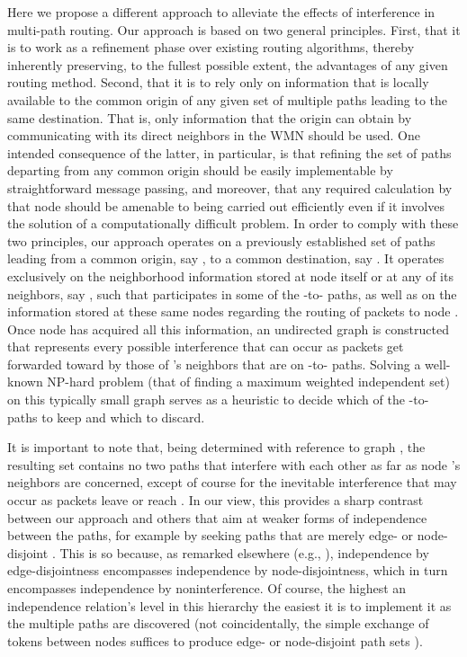 \documentclass{article}
\begin{document}
Here we propose a different approach to alleviate the effects of interference in
multi-path routing. Our approach is based on two general principles. First, that
it is to work as a refinement phase over existing routing algorithms, thereby
inherently preserving, to the fullest possible extent, the advantages of any
given routing method. Second, that it is to rely only on information that is
locally available to the common origin of any given set of multiple paths
leading to the same destination. That is, only information that the origin can
obtain by communicating with its direct neighbors in the WMN should be used. One
intended consequence of the latter, in particular, is that refining the set of
paths departing from any common origin should be easily implementable by
straightforward message passing, and moreover, that any required calculation by
that node should be amenable to being carried out efficiently even if it
involves the solution of a computationally difficult problem. In order to comply
with these two principles, our approach operates on a previously established set
of paths leading from a common origin, say , to a common destination, say
. It operates exclusively on the neighborhood information stored at node 
itself or at any of its neighbors, say , such that  participates in some
of the -to- paths, as well as on the information stored at these same
nodes regarding the routing of packets to node . Once node  has acquired
all this information, an undirected graph  is constructed that
represents every possible interference that can occur as packets get forwarded
toward  by those of 's neighbors that are on -to- paths. Solving a
well-known NP-hard problem (that of finding a maximum weighted independent set)
on this typically small graph serves as a heuristic to decide which of the
-to- paths to keep and which to discard.

It is important to note that, being determined with reference to graph ,
the resulting set contains no two paths that interfere with each other as far as
node 's neighbors are concerned, except of course for the inevitable
interference that may occur as packets leave  or reach . In our view, this
provides a sharp contrast between our approach and others that aim at weaker
forms of independence between the paths, for example by seeking paths that are
merely edge- or node-disjoint
\cite{Lee2001,Sung2001,Tsirigos2001,Cruz2003,Alicherry2006,Sheriff2006,Wang2006,Xiaojun2007,Wang2008,Wang2009}.
This is so because, as remarked elsewhere (e.g., \cite{Pearlman2000}),
independence by edge-disjointness encompasses independence by node-disjointness,
which in turn encompasses independence by noninterference. Of course, the
highest an independence relation's level in this hierarchy the easiest it is to
implement it as the multiple paths are discovered (not coincidentally, the
simple exchange of tokens between nodes suffices to produce edge- or
node-disjoint path sets \cite{Xuefei2004}).
\end{document}
